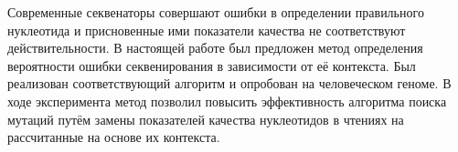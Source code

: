 \startconclusionpage

Современные секвенаторы совершают ошибки в определении правильного нуклеотида и присновенные ими показатели качества не соответствуют действительности. В настоящей работе был предложен метод определения вероятности ошибки секвенирования в зависимости от её контекста. Был реализован соответствующий алгоритм и опробован на человеческом геноме. В ходе эксперимента метод позволил повысить эффективность алгоритма поиска мутаций путём замены показателей качества нуклеотидов в чтениях на рассчитанные на основе их контекста.
